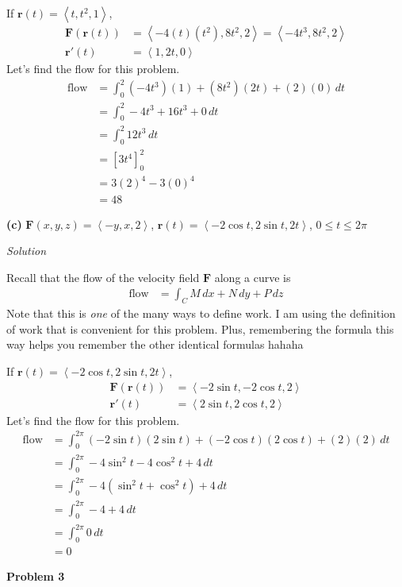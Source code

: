 \documentclass{article}
\newcommand{\lrp}[1]{\left( #1 \right)}
\newcommand{\lra}[1]{\left\langle #1 \right\rangle}
\newcommand{\lrb}[1]{\left[ #1 \right]}
\renewcommand{\r}[0]{\mathbf{r}}
\newcommand{\F}[0]{\mathbf{F}}
\newcommand{\Solution}{\textit{Solution}}
\begin{document}
If $\r(t)=\lra{t,t^2,1}$,
\begin{align*}
    \F\lrp{\r(t)}&=\lra{-4(t)(t^2),8t^2,2}=\lra{-4t^3,8t^2,2}\\
    \r'(t)&=\lra{1,2t,0}
\end{align*}
Let's find the flow for this problem.
\begin{align*}
    \text{flow}&=\int_0^2 \lrp{-4t^3}\lrp{1}+\lrp{8t^2}\lrp{2t}+(2)(0)\,dt\\
    &=\int_0^2 -4t^3 + 16t^3 + 0\,dt\\
    &=\int_0^2 12t^3\,dt\\
    &=\lrb{3t^4}_0^2\\
    &=3(2)^4-3(0)^4\\
    &=\boxed{48}
\end{align*}
{}\textbf{(c)} $\displaystyle\F(x,y,z)=\lra{-y, x, 2}$, $\r(t)=\lra{-2\cos t, 2\sin t, 2t}$, $0\leq t \leq 2\pi$

\Solution

Recall that the flow of the velocity field $\F$ along a curve is
\begin{align*}
    \text{flow}&=\int_C M\,dx + N\,dy+ P\,dz
\end{align*}
Note that this is \textit{one} of the many ways to define work. I am using the definition of work that is convenient for this problem. Plus, remembering the formula this way helps you remember the other identical formulas hahaha

If $\r(t)=\lra{-2\cos t, 2\sin t, 2t}$,
\begin{align*}
    \F\lrp{\r(t)}&=\lra{-2\sin t, -2\cos t, 2}\\
    \r'(t)&=\lra{2\sin t, 2\cos t, 2}
\end{align*}
Let's find the flow for this problem.
\begin{align*}
    \text{flow}&=\int_0^{2\pi}\lrp{-2\sin t}\lrp{2\sin t}+\lrp{-2\cos t}\lrp{2\cos t}+\lrp{2}\lrp{2}\,dt\\
    &=\int_0^{2\pi} -4\sin^2 t -4\cos ^2 t+4\,dt\\
    &=\int_0^{2\pi}-4\lrp{\sin^2 t + \cos ^2 t}+4\,dt\\
    &=\int_0^{2\pi} -4+4\,dt\tag{$\sin^2 t +\cos^2 t$}\\
    &=\int_0^{2\pi} 0 \,dt\\
    &=\boxed{0}
\end{align*}
{}\textbf{Problem 3}
\end{document}
